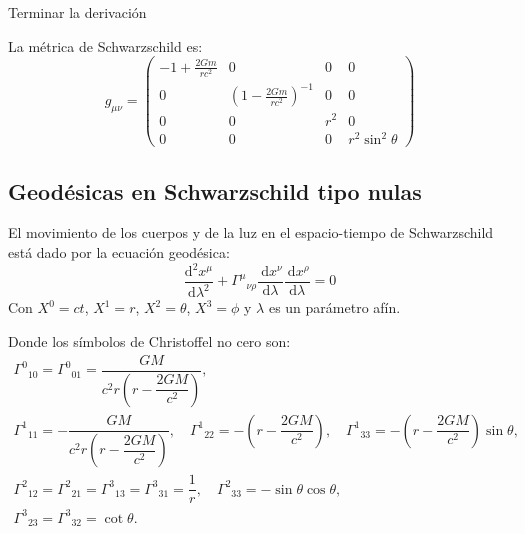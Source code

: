 \begin{task}{}{}
    Terminar la derivación
\end{task}
La métrica de Schwarzschild es:
\begin{equation}
    \boxed{g_{\mu \nu}=\left(\begin{array}{cccc}
                -1+\frac{2 G m}{r c^2} & 0                                       & 0   & 0                  \\
                0                      & \left(1-\frac{2 G m}{r c^2}\right)^{-1} & 0   & 0                  \\
                0                      & 0                                       & r^2 & 0                  \\
                0                      & 0                                       & 0   & r^2 \sin ^2 \theta
            \end{array}\right)}
\end{equation}
\subsection{Geodésicas en Schwarzschild tipo  nulas}

El movimiento de los cuerpos y de la luz en el espacio-tiempo de Schwarzschild está dado por la ecuación geodésica:
\begin{equation}
    \frac{\mathrm{d}^2 x^\mu}{\mathrm{d} \lambda^2}+\Gamma^\mu{ }_{\nu \rho} \frac{\mathrm{~d} x^\nu}{\mathrm{d} \lambda} \frac{\mathrm{~d} x^\rho}{\mathrm{d} \lambda}=0
    \label{eq:geodesic}
\end{equation}
Con $X^0 = ct$, $X^1 = r$, $X^2 = \theta$, $X^3 = \phi$ y $\lambda$ es un parámetro afín.

Donde los símbolos de Christoffel no cero son:
$$
    \begin{array}{l}
        \Gamma^0{ }_{10}=\Gamma^0{ }_{01}=\dfrac{G M}{c^2 r\left(r - \dfrac{2 G M}{c^2}\right)},                                                                                                                       \\
        \Gamma^1{ }_{11}=-\dfrac{G M}{c^2 r\left(r - \dfrac{2 G M}{c^2}\right)}, \quad \Gamma^1{ }_{22}=-\left(r - \dfrac{2 G M}{c^2}\right), \quad \Gamma^1{ }_{33}=-\left(r - \dfrac{2 G M}{c^2}\right) \sin \theta, \\
        \Gamma^2{ }_{12}=\Gamma^2{ }_{21}=\Gamma^3{ }_{13}=\Gamma^3{ }_{31}=\dfrac{1}{r}, \quad \Gamma^2{ }_{33}=-\sin \theta \cos \theta,                                                                             \\
        \Gamma^3{ }_{23}=\Gamma^3{ }_{32}=\cot \theta.
    \end{array}
$$

